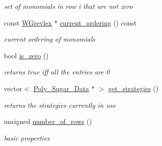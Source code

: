 \begin{Indent}
\begin{DoxyCompactItemize}
\begin{DoxyCompactList}\small\item\em set of monomials in row {\ttfamily i} that are not zero \end{DoxyCompactList}\item 
\mbox{\label{group___g_b_computation_ad7c37d08523c27bbb1990534abd95461}} 
const \hyperlink{group__orderinggroup_class_w_grevlex}{W\+Grevlex} $\ast$ \hyperlink{group___g_b_computation_ad7c37d08523c27bbb1990534abd95461}{current\+\_\+ordering} () const
\begin{DoxyCompactList}\small\item\em current ordering of monomials \end{DoxyCompactList}\item 
\mbox{\label{group___g_b_computation_aee8c1358071a26e60b2e50f9678dcfb0}} 
bool \hyperlink{group___g_b_computation_aee8c1358071a26e60b2e50f9678dcfb0}{is\+\_\+zero} ()
\begin{DoxyCompactList}\small\item\em returns {\ttfamily true} iff all the entries are 0 \end{DoxyCompactList}\item 
\mbox{\label{group___g_b_computation_a1e58764d1bee3437e2bfa74fbb847b1a}} 
vector$<$ \hyperlink{group__strategygroup_class_poly___sugar___data}{Poly\+\_\+\+Sugar\+\_\+\+Data} $\ast$ $>$ \hyperlink{group___g_b_computation_a1e58764d1bee3437e2bfa74fbb847b1a}{get\+\_\+strategies} ()
\begin{DoxyCompactList}\small\item\em returns the strategies currently in use \end{DoxyCompactList}\item 
\mbox{\label{group___g_b_computation_ac56c717e4015d655e40b2c8033fa9d92}} 
unsigned \hyperlink{group___g_b_computation_ac56c717e4015d655e40b2c8033fa9d92}{number\+\_\+of\+\_\+rows} ()
\begin{DoxyCompactList}\small\item\em basic properties \end{DoxyCompactList}\item 
\mbox{\label{group___g_b_computation_aee8c1358071a26e60b2e50f9678dcfb0}} 

\end{DoxyCompactItemize}
\end{Indent}
